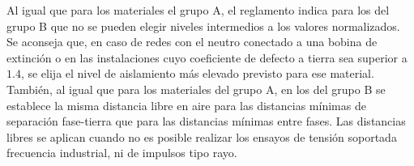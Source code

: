             \begin{table}[H]
                \centering
                \renewcommand{\arraystretch}{1.1}
                \caption{Tensiones soportadas nominales a frecuencia industrial y a impulsos tipo rayo. Distancia mínima de asilamiento fase a tierra y entre fases para los materiales del grupo B.}
                \label{tab:tensionesSoportadasB}
            \end{table}

            Al igual que para los materiales el grupo A, el reglamento indica para los del grupo B que no se pueden elegir niveles intermedios a los valores normalizados. Se aconseja que, en caso de redes con el neutro conectado a una bobina de extinción o en las instalaciones cuyo coeficiente de defecto a tierra sea superior a $1.4$, se elija el nivel de aislamiento más elevado previsto para ese material. También, al igual que para los materiales del grupo A, en los del grupo B se establece la misma distancia libre en aire para las distancias mínimas de separación fase-tierra que para las distancias mínimas entre fases. Las distancias libres se aplican cuando no es posible realizar los ensayos de tensión soportada frecuencia industrial, ni de impulsos tipo rayo.
        

